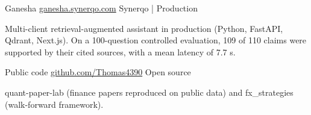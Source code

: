 \begin{cventries}
{\begin{cvitems}
      \end{cvitems}
    }
  \cvrow
    {Ganesha}
    {\href{https://ganesha.synerqo.com}{ganesha.synerqo.com}}
    {Synerqo | Production}
    {
      \begin{cvitems}
        \item{Multi-client retrieval-augmented assistant in production (Python, FastAPI, Qdrant, Next.js). On a 100-question controlled evaluation, 109 of 110 claims were supported by their cited sources, with a mean latency of 7.7 s.}
      \end{cvitems}
    }
  \cvrow
    {Public code}
    {\href{https://github.com/Thomas4390}{github.com/Thomas4390}}
    {Open source}
    {
      \begin{cvitems}
        \item{quant-paper-lab (finance papers reproduced on public data) and fx\_strategies (walk-forward framework).}
      \end{cvitems}
    }
\end{cventries}
